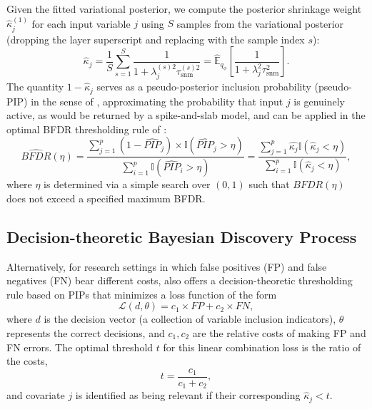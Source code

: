 Given the fitted variational posterior, we compute the 
posterior shrinkage weight $\hat{\kappa}^{(1)}_j$ for each input variable $j$ using $S$ samples from the variational posterior (dropping the layer superscript and replacing with the sample index $s$):
\begin{equation}
  \hat{\kappa}_j
  = 
    \frac{1}{S} \sum_{s=1}^{S} \frac{1}{1 + \lambda_j^{(s)2} \tau_{\text{snm}}^{(s)2 }}
  =
    \hat{\mathbb{E}}_{q_\phi}\!\left[\frac{1}{1 + \lambda_j^{2} \tau_{\text{snm}}^{2 }}\right].
  \label{eq:kappa-hat}
\end{equation}
The
quantity $1 - \hat{\kappa}_j$ serves as a pseudo-posterior
inclusion probability (pseudo-PIP) in the sense of
\citet{carvalho_handling_2009}, approximating the probability
that input $j$ is genuinely active, as would be returned by a
spike-and-slab model, and can be applied in the optimal BFDR thresholding rule of
\citet{bernardo_fdr_2007, guindani_bayesian_2009}:
\begin{equation}
    \widehat{BFDR}(\eta)
    =
        \frac
            {\sum_{j=1}^p  \left(1-\widehat{PIP}_j  \right)
            \times
            \mathbb{I}\left(
                \widehat{PIP}_j > \eta
                \right)}
            {\sum_{i=1}^p 
            \mathbb{I}\left(
                \widehat{PIP}_i > \eta
                \right)}
    =
        \frac
            {\sum_{j=1}^p  \hat{\kappa_j}  \mathbb{I}\left(
                \hat{\kappa}_j < \eta
                \right)}
            {\sum_{i=1}^p 
            \mathbb{I}\left(
                \hat{\kappa}_j < \eta
            \right)},
    \label{eq:bfdr}
\end{equation}
where $\eta$ is determined via a simple search over $(0,1)$ such that $BFDR(\eta)$ does not exceed a specified maximum BFDR.

\subsection{Decision-theoretic Bayesian Discovery Process}
\label{subsec:ch3-decision}
Alternatively, for research settings in which false positives (FP) and false negatives (FN) bear different costs,  
\citet{guindani_bayesian_2009} also offers a decision-theoretic thresholding rule based on PIPs that minimizes a loss function of the form 
\begin{equation}
    \mathcal{L}(d, \theta) = c_1 \times FP + c_2 \times FN,
\end{equation}
where $d$ is the decision vector (a collection of variable inclusion indicators), $\theta$ represents the correct decisions, and $c_1, c_2$ are the relative costs of making FP and FN errors.  The optimal threshold $t$ for this linear combination loss is the ratio of the costs, 
\begin{equation}
    t = \dfrac{c_1}{c_1 + c_2},
\end{equation}
and covariate $j$ is identified as being relevant if their corresponding $\hat{\kappa}_j < t$.


